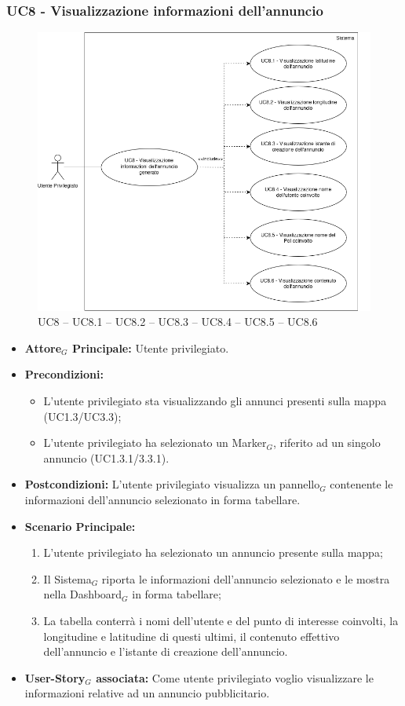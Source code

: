 \documentclass[10pt]{article}
\begin{document}
\begin{justify}
\subsubsection{\textbf{UC8 - Visualizzazione informazioni dell'annuncio}}
\begin{figure}[H]
    \centering
    \includegraphics[width=0.7\linewidth]{UC8image.png}
    \caption{UC8 -- UC8.1 -- UC8.2 -- UC8.3 -- UC8.4 -- UC8.5 -- UC8.6}
    \label{fig:UC8}
\end{figure}
\label{UC8}
\begin{itemize}
    \item \textbf{Attore$_G$ Principale:} Utente privilegiato.
    \item \textbf{Precondizioni:} 
        \begin{itemize}
    	        \item L'utente privilegiato sta visualizzando gli annunci presenti sulla mappa (UC1.3/UC3.3);
    	        \item L'utente privilegiato ha selezionato un Marker$_G$, riferito ad un singolo annuncio (UC1.3.1/3.3.1).
        \end{itemize}
    \item \textbf{Postcondizioni:} L'utente privilegiato visualizza un pannello$_G$ contenente le informazioni dell'annuncio selezionato in forma tabellare. 
    \item \textbf{Scenario Principale:} 
        \begin{enumerate}
          \item L'utente privilegiato ha selezionato un annuncio presente sulla mappa;
          \item Il Sistema$_G$ riporta le informazioni dell'annuncio selezionato e le mostra nella Dashboard$_G$ in forma tabellare;
          \item La tabella conterrà i nomi dell'utente e del punto di interesse coinvolti, la longitudine e latitudine di questi ultimi, il contenuto effettivo dell'annuncio e l'istante di creazione dell'annuncio.
	\end{enumerate}
    \item \textbf{User-Story$_G$ associata:} Come utente privilegiato voglio visualizzare le informazioni relative ad un annuncio pubblicitario.
\end{itemize}

\end{justify}
\end{document}
